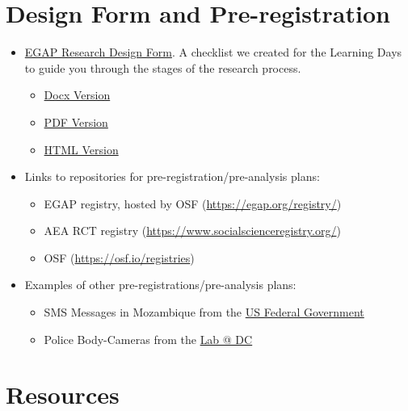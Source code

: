 \documentclass[12pt,]{book}
\begin{document}
\hypertarget{design-form-and-pre-registration}{%
\section{Design Form and Pre-registration}\label{design-form-and-pre-registration}}

\begin{itemize}
\item
  \href{https://egap.github.io/learningdays-resources/Exercises/design-form.html}{EGAP Research Design Form}. A checklist we created for the Learning Days to guide you through the stages of the research process.

  \begin{itemize}
  \item
    \href{https://egap.github.io/learningdays-resources/Exercises/design-form.docx}{Docx Version}
  \item
    \href{https://egap.github.io/learningdays-resources/Exercises/design-form.pdf}{PDF Version}
  \item
    \href{https://egap.github.io/learningdays-resources/Exercises/design-form.html}{HTML Version}
  \end{itemize}
\item
  Links to repositories for pre-registration/pre-analysis plans:

  \begin{itemize}
  \item
    EGAP registry, hosted by OSF (\url{https://egap.org/registry/})
  \item
    AEA RCT registry (\url{https://www.socialscienceregistry.org/})
  \item
    OSF (\url{https://osf.io/registries})
  \end{itemize}
\item
  Examples of other pre-registrations/pre-analysis plans:

  \begin{itemize}
  \item
    SMS Messages in Mozambique from the \href{https://oes.gsa.gov/projects/sms-mozambique/}{US Federal Government}
  \item
    Police Body-Cameras from the \href{https://osf.io/472zh}{Lab @ DC}
  \end{itemize}
\end{itemize}

\hypertarget{resources}{%
\section{Resources}\label{resources}}
\end{document}
